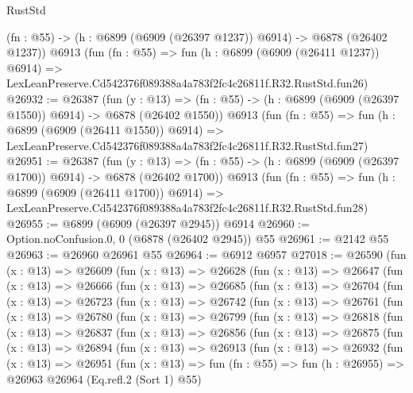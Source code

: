 \begin{lexlean}{RustStd}
\begin{coremodule}
    (fn : @55) -> (h : @6899 (@6909 (@26397 @1237)) @6914) -> @6878 (@26402 @1237))
    @6913
    (fun (fn : @55) =>
    fun (h : @6899 (@6909 (@26411 @1237)) @6914) =>
    LexLeanPreserve.Cd542376f089388a4a783f2fc4c26811f.R32.RustStd.fun26)
@26932 := @26387
    (fun (y : @13) =>
    (fn : @55) -> (h : @6899 (@6909 (@26397 @1550)) @6914) -> @6878 (@26402 @1550))
    @6913
    (fun (fn : @55) =>
    fun (h : @6899 (@6909 (@26411 @1550)) @6914) =>
    LexLeanPreserve.Cd542376f089388a4a783f2fc4c26811f.R32.RustStd.fun27)
@26951 := @26387
    (fun (y : @13) =>
    (fn : @55) -> (h : @6899 (@6909 (@26397 @1700)) @6914) -> @6878 (@26402 @1700))
    @6913
    (fun (fn : @55) =>
    fun (h : @6899 (@6909 (@26411 @1700)) @6914) =>
    LexLeanPreserve.Cd542376f089388a4a783f2fc4c26811f.R32.RustStd.fun28)
@26955 := @6899 (@6909 (@26397 @2945)) @6914
@26960 := Option.noConfusion.{0, 0} (@6878 (@26402 @2945)) @55
@26961 := @2142 @55
@26963 := @26960 @26961 @55
@26964 := @6912 @6957
@27018 := @26590
    (fun (x : @13) =>
    @26609
      (fun (x : @13) =>
      @26628
        (fun (x : @13) =>
        @26647
          (fun (x : @13) =>
          @26666
            (fun (x : @13) =>
            @26685
              (fun (x : @13) =>
              @26704
                (fun (x : @13) =>
                @26723
                  (fun (x : @13) =>
                  @26742
                    (fun (x : @13) =>
                    @26761
                      (fun (x : @13) =>
                      @26780
                        (fun (x : @13) =>
                        @26799
                          (fun (x : @13) =>
                          @26818
                            (fun (x : @13) =>
                            @26837
                              (fun (x : @13) =>
                              @26856
                                (fun (x : @13) =>
                                @26875
                                  (fun (x : @13) =>
                                  @26894
                                    (fun (x : @13) =>
                                    @26913
                                      (fun (x : @13) =>
                                      @26932
                                        (fun (x : @13) =>
                                        @26951
                                          (fun (x : @13) =>
                                          fun (fn : @55) =>
                                          fun (h : @26955) =>
                                          @26963
                                            @26964
                                            (Eq.refl.{2} (Sort 1) @55)

\end{coremodule}
\end{lexlean}
